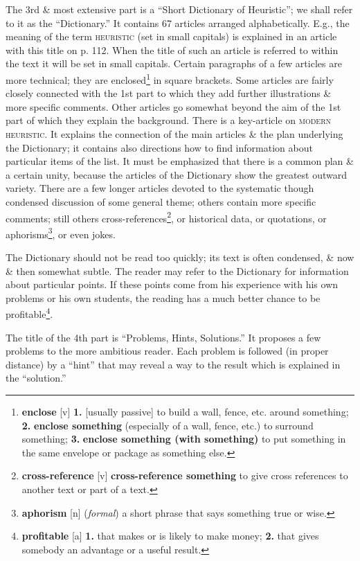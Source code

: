 \documentclass[oneside]{book}
\numberwithin{equation}{section}
\begin{document}
The 3rd \& most extensive part is a ``Short Dictionary of Heuristic''; we shall refer to it as the ``Dictionary.'' It contains 67 articles arranged alphabetically. E.g., the meaning of the term \textsc{heuristic} (set in small capitals) is explained in an article with this title on p. 112. When the title of such an article is referred to within the text it will be set in small capitals. Certain paragraphs of a few articles are more technical; they are enclosed\footnote{\textbf{enclose} [v] \textbf{1.} [usually passive] to build a wall, fence, etc. around something; \textbf{2.} \textbf{enclose something} (especially of a wall, fence, etc.) to surround something; \textbf{3.} \textbf{enclose something (with something)} to put something in the same envelope or package as something else.} in square brackets. Some articles are fairly closely connected with the 1st part to which they add further illustrations \& more specific comments. Other articles go somewhat beyond the aim of the 1st part of which they explain the background. There is a key-article on \textsc{modern heuristic}. It explains the connection of the main articles \& the plan underlying the Dictionary; it contains also directions how to find information about particular items of the list. It must be emphasized that there is a common plan \& a certain unity, because the articles of the Dictionary show the greatest outward variety. There are a few longer articles devoted to the systematic though condensed discussion of some general theme; others contain more specific comments; still others cross-references\footnote{\textbf{cross-reference} [v] \textbf{cross-reference something} to give cross references to another text or part of a text.}, or historical data, or quotations, or aphorisms\footnote{\textbf{aphorism} [n] (\textit{formal}) a short phrase that says something true or wise.}, or even jokes.

The Dictionary should not be read too quickly; its text is often condensed, \& now \& then somewhat subtle. The reader may refer to the Dictionary for information about particular points. If these points come from his experience with his own problems or his own students, the reading has a much better chance to be profitable\footnote{\textbf{profitable} [a] \textbf{1.} that makes or is likely to make money; \textbf{2.} that gives somebody an advantage or a useful result.}.

The title of the 4th part is ``Problems, Hints, Solutions.'' It proposes a few problems to the more ambitious reader. Each problem is followed (in proper distance) by a ``hint'' that may reveal a way to the result which is explained in the ``solution.''
\end{document}
